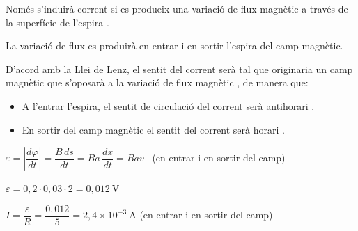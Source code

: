 \begin{solapartat}
Només s'induirà corrent si es produeix una variació de flux magnètic a través de la superfície de l'espira \unskip.

La variació de flux es produirà en entrar i en sortir l'espira del camp magnètic. 

D'acord amb la Llei de Lenz, el sentit del corrent serà tal que originaria un camp magnètic que s'oposarà a la variació de flux magnètic \unskip, de manera que:
\begin{itemize}[label=-]
  \item A l'entrar l'espira, el sentit de circulació del corrent serà antihorari \unskip.
  \item En sortir del camp magnètic el sentit del corrent serà horari \unskip.
\end{itemize}
\end{solapartat}

\begin{solapartat}
 $\varepsilon = \left|\dfrac{d\varphi}{dt}\right| = \dfrac{B\,ds}{dt} = Ba\,\dfrac{dx}{dt} = Bav$ \ (en entrar i en sortir del camp)

 $\varepsilon = 0,2\cdot 0,03\cdot 2 = 0,012\ \mathrm{V}$

 $I = \dfrac{\varepsilon}{R} = \dfrac{0,012}{5} = 2,4\times 10^{-3}\ \mathrm{A}$ (en entrar i en sortir del camp)
\end{solapartat}
